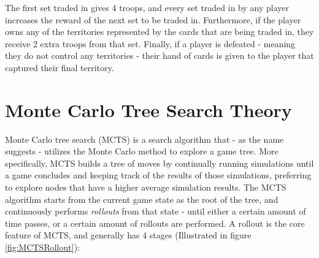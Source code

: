 The first set traded in gives 4 troops, and every set traded in by any player increases the reward of the next set to be traded in. Furthermore, if the player owns any of the territories represented by the cards that are being traded in, they receive 2 extra troops from that set. Finally, if a player is defeated - meaning they do not control any territories - their hand of cards is given to the player that captured their final territory.

\section{Monte Carlo Tree Search Theory}
\label{MCTSTheory}

Monte Carlo tree search (MCTS) \cite{Coulom2007MonteCarlo} is a search algorithm that - as the name suggests - utilizes the Monte Carlo method to explore a game tree. More specifically, MCTS builds a tree of moves by continually running simulations until a game concludes and keeping track of the results of those simulations, preferring to explore nodes that have a higher average simulation results. The MCTS algorithm starts from the current game state as the root of the tree, and continuously performs \textit{rollouts} from that state - until either a certain amount of time passes, or a certain amount of rollouts are performed. A rollout is the core feature of MCTS, and generally has 4 stages (Illustrated in figure \ref{fig:MCTSRollout}):
